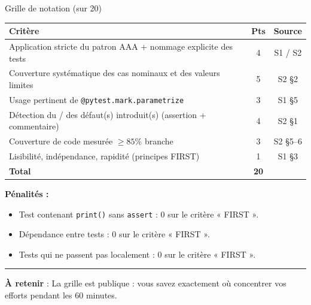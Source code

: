 \documentclass[aspectratio=169,11pt]{beamer}
\newcommand{\takeaway}[1]{%
\vfill\begin{beamercolorbox}[wd=\linewidth,sep=0.4em]{}
\color{accent2}\rule[0.6ex]{1.2em}{1.2pt}\hspace{0.4em}%
\textbf{\color{accent2}\small À retenir} \textcolor{textsoft}{:} %
{\small\color{textmain}#1}
\end{beamercolorbox}}
\begin{document}
\begin{frame}[t,shrink=10]{Grille de notation (sur 20)}
\footnotesize
\begin{tabular}{@{}p{8.6cm} c c@{}}
\toprule
\textbf{Critère} & \textbf{Pts} & \textbf{Source} \\
\midrule
Application stricte du patron AAA + nommage explicite des tests
& 4 & S1 / S2 \\
\addlinespace[0.15em]
Couverture systématique des cas nominaux et des valeurs limites
& 5 & S2 §2 \\
\addlinespace[0.15em]
Usage pertinent de \texttt{@pytest.mark.parametrize}
& 3 & S1 §5 \\
\addlinespace[0.15em]
Détection du / des défaut(s) introduit(s) (assertion + commentaire)
& 4 & S2 §1 \\
\addlinespace[0.15em]
Couverture de code mesurée $\geq 85\%$ branche
& 3 & S2 §5--6 \\
\addlinespace[0.15em]
Lisibilité, indépendance, rapidité (principes FIRST)
& 1 & S1 §3 \\
\midrule
\textbf{Total} & \textbf{20} & \\
\bottomrule
\end{tabular}
\vspace{0.5cm}

\textbf{Pénalités :}
\begin{itemize}\itemsep0.05em
\item Test contenant \texttt{print()} sans \texttt{assert} : 0 sur le critère « FIRST ».
\item Dépendance entre tests : 0 sur le critère « FIRST ».
\item Tests qui ne passent pas localement : 0 sur le critère « FIRST ».
\end{itemize}
\takeaway{La grille est publique : vous savez exactement où concentrer vos efforts pendant les 60 minutes.}
\end{frame}
\end{document}
